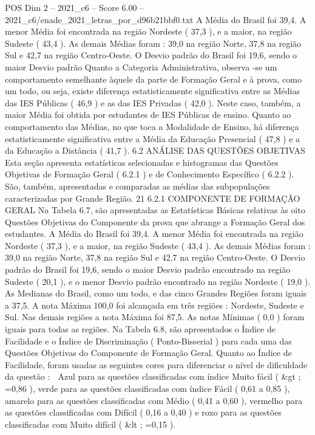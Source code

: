\begin{textsample}{POS Dim 2 – 2021\_c6 – Score 6.00 – 2021\_c6/enade\_2021\_letras\_por\_d96b21bbf0.txt}
A Média do Brasil foi 39,4.
A menor Média foi encontrada na região Nordeste ( 37,3 ), e a maior, na região Sudeste ( 43,4 ).
As demais Médias foram : 39,0 na região Norte, 37,8 na região Sul e 42,7 na região Centro-Oeste.
O Desvio padrão do Brasil foi 19,6, sendo o maior Desvio padrão Quanto a Categoria Administrativa, observa -se um comportamento semelhante àquele da parte de Formação Geral e à prova, como um todo, ou seja, existe diferença estatisticamente significativa entre as Médias das IES Públicas ( 46,9 ) e as das IES Privadas ( 42,0 ).
Neste caso, também, a maior Média foi obtida por estudantes de IES Públicas de ensino.
Quanto ao comportamento das Médias, no que toca a Modalidade de Ensino, há diferença estatisticamente significativa entre a Média da Educação Presencial ( 47,8 ) e a da Educação a Distância ( 41,7 ). 6.2 ANÁLISE DAS QUESTÕES OBJETIVAS Esta seção apresenta estatísticas selecionadas e histogramas das Questões Objetivas de Formação Geral ( 6.2.1 ) e de Conhecimento Específico ( 6.2.2 ).
São, também, apresentadas e comparadas as médias das subpopulações caracterizadas por Grande Região. 21 6.2.1 COMPONENTE DE FORMAÇÃO GERAL Na Tabela 6.7, são apresentadas as Estatísticas Básicas relativas às oito Questões Objetivas do Componente da prova que abrange a Formação Geral dos estudantes.
A Média do Brasil foi 39,4.
A menor Média foi encontrada na região Nordeste ( 37,3 ), e a maior, na região Sudeste ( 43,4 ).
As demais Médias foram : 39,0 na região Norte, 37,8 na região Sul e 42,7 na região Centro-Oeste.
O Desvio padrão do Brasil foi 19,6, sendo o maior Desvio padrão encontrado na região Sudeste ( 20,1 ), e o menor Desvio padrão encontrado na região Nordeste ( 19,0 ).
As Medianas do Brasil, como um todo, e das cinco Grandes Regiões foram iguais a 37,5.
A nota Máxima 100,0 foi alcançada em três regiões : Nordeste, Sudeste e Sul.
Nas demais regiões a nota Máxima foi 87,5.
As notas Mínimas ( 0,0 ) foram iguais para todas as regiões.
Na Tabela 6.8, são apresentados o Índice de Facilidade e o Índice de Discriminação ( Ponto-Bisserial ) para cada uma das Questões Objetivas do Componente de Formação Geral.
Quanto ao Índice de Facilidade, foram usadas as seguintes cores para diferenciar o nível de dificuldade da questão :  Azul para as questões classificadas com índice Muito fácil ( \&gt ; =0,86 ), verde para as questões classificadas com índice Fácil ( 0,61 a 0,85 ), amarelo para as questões classificadas com Médio ( 0,41 a 0,60 ), vermelho para as questões classificadas com Difícil ( 0,16 a 0,40 ) e roxo para as questões classificadas com Muito difícil ( \&lt ; =0,15 ).

\end{textsample}

